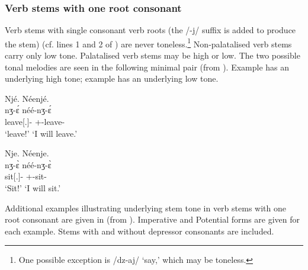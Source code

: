 \subsubsection{Verb stems with one root consonant}\label{sec:6.7.2.1}

Verb stems with single consonant verb roots (the /-j/ suffix is added to produce the stem) (cf. lines 1 and 2 of ) are never toneless.\footnote{One possible exception is /dz-aj/ ‘say,’ which may be toneless.} Non-palatalised verb stems carry only low tone. Palatalised verb stems may be high or low.  The two possible tonal melodies are seen in the following minimal pair (from \citealt{FriesenMamalis2008}). Example  has an underlying high tone; example  has an underlying low tone. 

\ea \label{ex:6:19}
Njé. \hspace{63pt}   Néenjé.\\
\gll  nʒ-\'{ɛ}  \hspace{10pt}    néé-nʒ-\'{ɛ}\\
      leave[{\twoS}.{\IMP}]{}-{\CL} \hspace{5pt} {\oneS}+{\POT}-leave{}-{\CL}\\
\glt  ‘leave!’  \hspace{50pt}  ‘I will leave.’
\z

\ea \label{ex:6:20}
Nje.  \hspace{50pt}    Néenje.\\
\gll  nʒ-\`{ɛ}  \hspace{10pt}    néé-nʒ-\`{ɛ}\\
      sit[{\twoS}.{\IMP}]-{\CL} \hspace{5pt} {\oneS}+{\POT}-sit{}-{\CL}\\
\glt  ‘Sit!’ \hspace{50pt}   ‘I will sit.’
\z

Additional examples illustrating underlying stem tone in verb stems with one root consonant are given in  (from \citealt{FriesenMamalis2008}). Imperative and Potential forms are given for each example. Stems with and without depressor consonants are included. 

